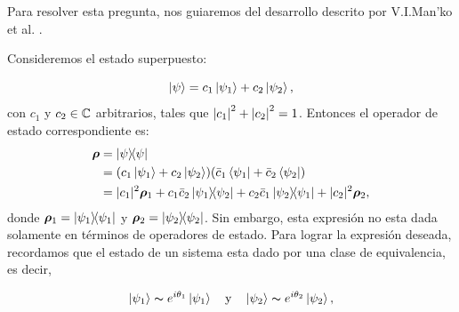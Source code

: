 \documentclass[../Main.tex]{subfiles}
\begin{document}
Para resolver esta pregunta, nos guiaremos del desarrollo descrito por V.I.Man'ko et al. \cite{MankoComposition}. 

Consideremos el estado superpuesto:

\begin{equation}
    \ket{\psi}=c_1\ket{\psi_1}+c_2\ket{\psi_2},
    \label{eq:superposicion Hilbert}
\end{equation}
con $c_1$ y $c_2\in\mathbb{C}$ arbitrarios, tales que $\abs{c_1}^2+\abs{c_2}^2=1$. Entonces el operador de estado correspondiente es:
\begin{align}
    \bm{\rho} &= \op{\psi} \notag\\
    &= \qty(c_1\ket{\psi_1}+c_2\ket{\psi_2})
       \qty(\bar{c}_1\bra{\psi_1}+\bar{c}_2\bra{\psi_2})\notag\\
    &= |c_1|^2\bm{\rho}_1
    + c_1\bar{c}_2\op{\psi_1}{\psi_2}
    + c_2\bar{c}_1\op{\psi_2}{\psi_1}
    + |c_2|^2\bm{\rho}_2,
    \label{eq:superposicion_operadores2}
\end{align}
donde $\bm{\rho}_1=\op{\psi_1}$ y $\bm{\rho}_2=\op{\psi_2}$. Sin embargo, esta expresión no esta dada solamente en términos de operadores de estado. Para lograr la expresión deseada, recordamos que el estado de un sistema esta dado por una clase de equivalencia, es decir,

\begin{equation}
    \ket{\psi_1} \thicksim e^{i\theta_1}\ket{\psi_1} \qq{y} \ket{\psi_2}\thicksim e^{i\theta_2}\ket{\psi_2},
\end{equation}

\end{document}
